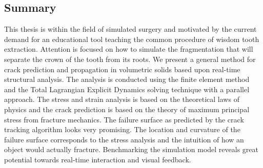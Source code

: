 
\begin{center}
\begin{minipage}{0.7\textwidth}
\chapter*{Summary}
This thesis is within the field of simulated surgery and motivated by
the current demand for an educational tool 
teaching the common procedure of wisdom tooth extraction.
Attention is focused on how to simulate the fragmentation 
that will separate the crown of the tooth from its roots.
%
We present a general method for crack prediction and propagation in
volumetric solids based upon
real-time structural analysis. The analysis is conducted using the
finite element method and the Total Lagrangian Explicit Dynamics
solving technique with a parallel approach.
%
The stress and strain analysis is based on 
the theoretical laws of physics and the crack prediction is based on
the theory of maximum principal stress from fracture
mechanics.
%
%
The failure surface as predicted by the
crack tracking algorithm looks very promising. The location and
curvature of the failure surface corresponds to the stress analysis
and the intuition of how an object would actually fracture.
%
Benchmarking the simulation model reveals great potential towards
real-time interaction and visual feedback.
\end{minipage}
\end{center}